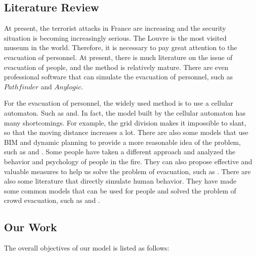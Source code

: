 \subsection{Literature Review}
At present, the terrorist attacks in France are increasing and the security situation is becoming increasingly serious. The Louvre is the most visited museum in the world. Therefore, it is necessary to pay great attention to the evacuation of personnel.
At present, there is much literature on the issue of evacuation of people, and the method is relatively mature. There are even professional software that can simulate the evacuation of personnel, such as $Pathfinder$ and $Anylogic$.

For the evacuation of personnel, the widely used method is to use a cellular automaton. Such as \cite{yang2005simulation}and\cite{wolf2004lattice}. In fact, the model built by the cellular automaton has many shortcomings. For example, the grid division makes it impossible to slant, so that the moving distance increases a lot.
There are also some models that use BIM and dynamic planning to provide a more reasonable idea of the problem, such as \cite{lin2008use}and \cite{wang2014bim}.
Some people have taken a different approach and analyzed the behavior and psychology of people in the fire. They can also propose effective and valuable measures to help us solve the problem of evacuation, such as \cite{jin2002visibility}.
There are also some literature that directly simulate human behavior. They have made some common models that can be used for people and solved the problem of crowd evacuation, such as \cite{pelechano2007controlling} and \cite{thalmann2007crowd}.

\subsection{Our Work}
The  overall objectives of our model is listed as follows:

